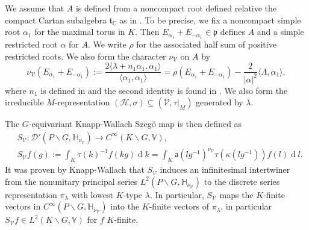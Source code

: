 \documentclass[a4paper,reqno]{amsart}
\numberwithin{equation}{section}
\def\rd{\operatorname{d}\!}
\def\C{\mathbb{C}}
\theoremstyle{definition}
\theoremstyle{remark}
\begin{document}
We assume that $A$ is defined from a noncompact root defined relative the compact Cartan subalgebra $\mathfrak{t}_\C$ as in \cite[Section 2]{knappwallach}. To be precise, we fix a noncompact simple root $\alpha_1$ for the maximal torus in $K$. Then $E_{\alpha_1}+E_{-\alpha_1}\in \mathfrak{p}$ defines $A$ and a simple restricted root $\alpha$ for $A$. We write $\rho$ for the associated half sum of positive restricted roots. We also form the character $\nu_{\mathcal{V}}$ on $A$ by 
\begin{equation}
\label{nuvforea}
\nu_{\mathcal{V}}(E_{\alpha_1}+E_{-\alpha_1}):=\frac{2\langle \lambda +n_1\alpha_1,\alpha_1\rangle}{\langle \alpha_1,\alpha_1\rangle}=\rho(E_{\alpha_1}+E_{-\alpha_1})-\frac{2}{|\alpha|^2}\langle \Lambda,\alpha_1\rangle,
\end{equation}
where $n_1$ is defined in \cite[Equation (6.5.b)]{knappwallach} and the second identity is found in \cite[Equation (1.4)]{blankrankone}. We also form the irreducible $M$-representation $(\mathcal{H},\sigma)\subseteq (\mathcal{V},\tau|_M)$ generated by $\lambda$.




The $G$-equivariant Knapp-Wallach Szegö map is then defined as
\begin{align*}
&S_{\mathcal{V}}:\mathcal{D}'(P\backslash G,\mathbb{H}_{\nu_{\mathcal{V}}})\to C^\infty(K\backslash G,\mathbb{V}), \\ 
&S_{\mathcal{V}} f(g):=\int_K \tau(k)^{-1} f(kg)\rd k=\int_K\mathsf{a}(lg^{-1})^{\nu_{\mathcal{V}}}\tau(\kappa(lg^{-1}))f(l)\rd l.
\end{align*}
It was proven by Knapp-Wallach \cite{knappwallach} that $S_{\mathcal{V}}$ induces an infinitesimal intertwiner from the nonunitary principal series $L^2(P\backslash G,\mathbb{H}_{\nu_{\mathcal{V}}})$ to the discrete series representation $\pi_\lambda$ with lowest $K$-type $\lambda$. In particular, $S_{\mathcal{V}}$ maps the $K$-finite vectors in $C^\infty(P\backslash G,\mathbb{H}_{\nu_{\mathcal{V}}})$ into the $K$-finite vectors of $\pi_\lambda$, in particular $S_{\mathcal{V}}f\in L^2(K\backslash G,\mathbb{V})$ for $f$ $K$-finite.
\end{document}
